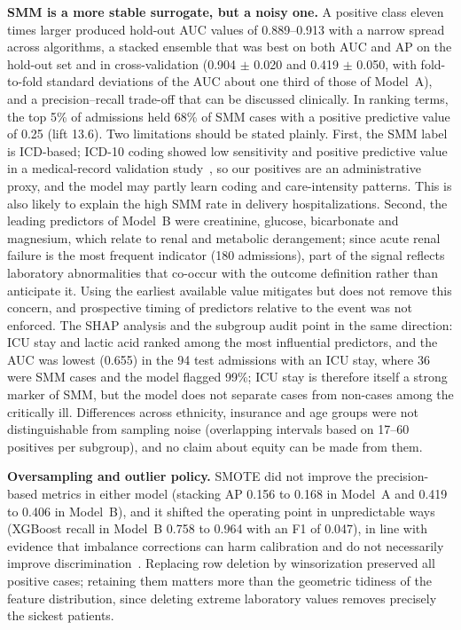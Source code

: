 \documentclass[healthcare,article,submit,pdftex,moreauthors]{Definitions/mdpi}
\begin{document}
\textbf{SMM is a more stable surrogate, but a noisy one.} A positive class eleven
times larger produced hold-out AUC values of 0.889--0.913 with a narrow spread across
algorithms, a stacked ensemble that was best on both AUC and AP on the hold-out set and in cross-validation
(0.904 $\pm$ 0.020 and 0.419 $\pm$ 0.050, with fold-to-fold standard deviations of the AUC about one
third of those of Model~A), and a precision--recall trade-off that can be discussed clinically.
In ranking terms, the top 5\% of admissions held 68\% of SMM cases with a positive predictive value of 0.25
(lift 13.6). Two limitations
should be stated plainly. First, the SMM label is ICD-based; ICD-10 coding showed
low sensitivity and positive predictive value in a medical-record validation
study~\cite{Boulet2024ICD10SMM}, so our positives are an administrative proxy, and
the model may partly learn coding and care-intensity patterns. This is also likely
to explain the high SMM rate in delivery hospitalizations. Second, the leading
predictors of Model~B were creatinine, glucose, bicarbonate and magnesium,
which relate to renal and metabolic derangement; since acute renal failure is the
most frequent indicator (180 admissions), part of the signal reflects
laboratory abnormalities that co-occur with the outcome definition rather than
anticipate it. Using the earliest available value mitigates but does not remove this
concern, and prospective timing of predictors relative to the event was not
enforced. The SHAP analysis and the subgroup audit point in the same direction: ICU stay and lactic acid
ranked among the most influential predictors, and the AUC was lowest (0.655) in the 94 test admissions with an ICU stay, where
36 were SMM cases and the model flagged 99\%; ICU stay is therefore itself a strong marker of SMM, but the model does not
separate cases from non-cases among the critically ill. Differences across ethnicity, insurance and age groups were not distinguishable from sampling noise
(overlapping intervals based on 17--60 positives per subgroup), and no claim about equity can be made from them.

\textbf{Oversampling and outlier policy.} SMOTE did not improve the precision-based
metrics in either model (stacking AP 0.156 to 0.168 in Model~A and 0.419 to 0.406 in Model~B), and it shifted the
operating point in unpredictable ways (XGBoost recall in Model~B 0.758 to 0.964 with an F1 of 0.047), in line with evidence that imbalance corrections can harm calibration
and do not necessarily improve discrimination~\cite{vandenGoorbergh2022Harm}.
Replacing row deletion by winsorization preserved all positive cases;
retaining them matters more than the geometric tidiness of the feature
distribution, since deleting extreme laboratory values removes precisely the
sickest patients.
\end{document}
